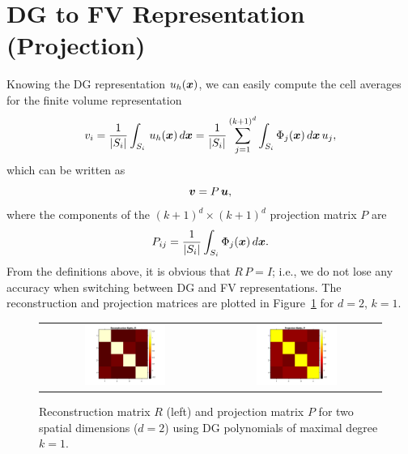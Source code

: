 \documentclass[10pt]{article}
\begin{document}
\section{DG to FV Representation (Projection)}

Knowing the DG representation $u_{h}(\boldsymbol{x})$, we can easily compute the cell averages for the finite volume representation
\begin{equation}
  v_{i} = \frac{1}{|S_{i}|}\int_{S_{i}}\,u_{h}(\boldsymbol{x})\,d\boldsymbol{x} = \frac{1}{|S_{i}|}\sum_{j=1}^{(k+1)^{d}}\int_{S_{i}}\Phi_{j}(\boldsymbol{x})\,d\boldsymbol{x}\,u_{j},
\end{equation}
which can be written as
\begin{equation}
  \boldsymbol{v} = P\,\boldsymbol{u},
\end{equation}
where the components of the $(k+1)^{d}\times(k+1)^{d}$ projection matrix $P$ are
\begin{equation}
  P_{ij} = \frac{1}{|S_{i}|}\int_{S_{i}}\Phi_{j}(\boldsymbol{x})\,d\boldsymbol{x}.  
\end{equation}
From the definitions above, it is obvious that $R\,P = I$; i.e., we do not lose any accuracy when switching between DG and FV representations.  
The reconstruction and projection matrices are plotted in Figure~\ref{fig:matrices} for $d=2$, $k=1$.  
\begin{figure}
  \centering
  \begin{tabular}{cc}
    \includegraphics[width=0.5\textwidth]{./ReconstructionMatrix} &
    \includegraphics[width=0.5\textwidth]{./ProjectionMatrix}
  \end{tabular}
   \caption{Reconstruction matrix $R$ (left) and projection matrix $P$ for two spatial dimensions ($d=2$) using DG polynomials of maximal degree $k=1$.}
  \label{fig:matrices}
\end{figure}
\end{document}

